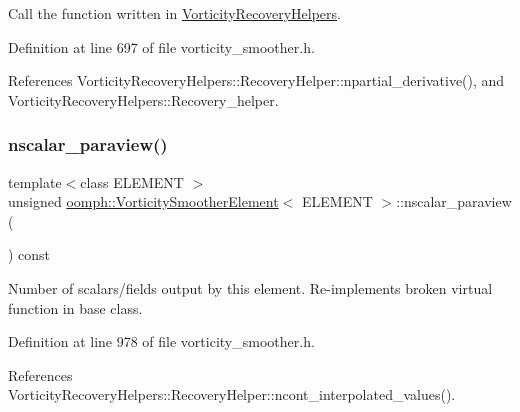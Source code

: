 Call the function written in \hyperlink{namespaceVorticityRecoveryHelpers}{Vorticity\+Recovery\+Helpers}. 



Definition at line 697 of file vorticity\+\_\+smoother.\+h.



References Vorticity\+Recovery\+Helpers\+::\+Recovery\+Helper\+::npartial\+\_\+derivative(), and Vorticity\+Recovery\+Helpers\+::\+Recovery\+\_\+helper.

\mbox{\label{classoomph_1_1VorticitySmootherElement_a79746eb31ff493e2d43ce4465b57b22a}} 
\subsubsection{\texorpdfstring{nscalar\+\_\+paraview()}{nscalar\_paraview()}}
{\footnotesize\ttfamily template$<$class E\+L\+E\+M\+E\+NT $>$ \\
unsigned \hyperlink{classoomph_1_1VorticitySmootherElement}{oomph\+::\+Vorticity\+Smoother\+Element}$<$ E\+L\+E\+M\+E\+NT $>$\+::nscalar\+\_\+paraview (\begin{DoxyParamCaption}{ }\end{DoxyParamCaption}) const\hspace{0.3cm}{\ttfamily [inline]}}



Number of scalars/fields output by this element. Re-\/implements broken virtual function in base class. 



Definition at line 978 of file vorticity\+\_\+smoother.\+h.



References Vorticity\+Recovery\+Helpers\+::\+Recovery\+Helper\+::ncont\+\_\+interpolated\+\_\+values().

\mbox{\label{classoomph_1_1VorticitySmootherElement_abfa785cee70e98c2e1890a1d2053abba}} 
